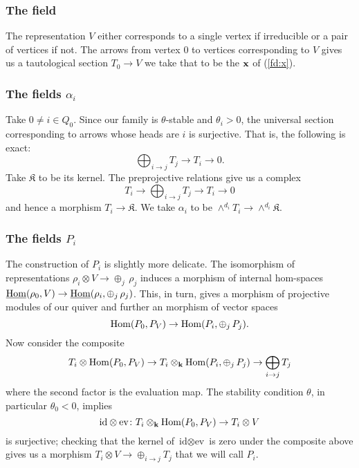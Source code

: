 \documentclass{amsart}
\theoremstyle{definition}
\begin{document}
\subsubsection{The field \bfx}

The representation $V$ either corresponds to a single vertex if irreducible or a pair of vertices if not.
The arrows from vertex $0$ to vertices corresponding to $V$ gives us a tautological section $T_0 \rightarrow V$ we take that to be the $\mathbf{x}$ of (\ref{fd:x}).

\subsubsection{The fields $\alpha_i$}

Take $0 \neq i \in Q_0$.
Since our family is $\theta$-stable and $\theta_i>0$, the universal section corresponding to arrows whose heads are $i$ is surjective. 
That is, the following is exact:
$$\bigoplus_{i \rightarrow j} T_j \longrightarrow T_i \longrightarrow 0.$$
Take $\mathfrak{K}$ to be its kernel.
The preprojective relations give us a complex
$$T_i \longrightarrow \bigoplus_{i \rightarrow j} T_j \longrightarrow T_i \longrightarrow 0$$
and hence a morphism $T_i \rightarrow \mathfrak{K}$.
We take $\alpha_i$ to be $\wedge^{d_i} T_i \rightarrow \wedge^{d_i}\mathfrak{K}.$

\subsubsection{The fields $P_i$}

The construction of $P_i$ is slightly more delicate.
The isomorphism of representations $\rho_i \otimes V \rightarrow \oplus_j\, \rho_j$ induces a morphism of internal hom-spaces $\underline{\operatorname{Hom}}(\rho_0, V) \rightarrow \underline{\operatorname{Hom}}(\rho_i, \oplus_j \, \rho_j)$.
This, in turn, gives a morphism of projective modules of our quiver and further an morphism of vector spaces $$\operatorname{Hom}(P_0, P_V) \rightarrow \operatorname{Hom}(P_i, \oplus_j \, P_j).$$
Now consider the composite $$T_i \otimes \operatorname{Hom}(P_0, P_V) \rightarrow T_i \otimes_{\mathbf{k}} \operatorname{Hom}(P_i, \oplus_j \, P_j) \rightarrow \bigoplus_{i \rightarrow j} T_j$$ where the second factor is the evaluation map.
The stability condition $\theta$, in particular $\theta_0<0$, implies $$\text{id} \otimes \text{ev} \colon T_i \otimes_{\mathbf{k}} \operatorname{Hom}(P_0, P_V) \rightarrow T_i \otimes V$$ is surjective; checking that the kernel of $\text{id} \otimes \text{ev}$ is zero under the composite above gives us a morphism $T_i \otimes V \rightarrow \oplus_{i \rightarrow j} T_j$ that we will call $P_i$.
\end{document}
